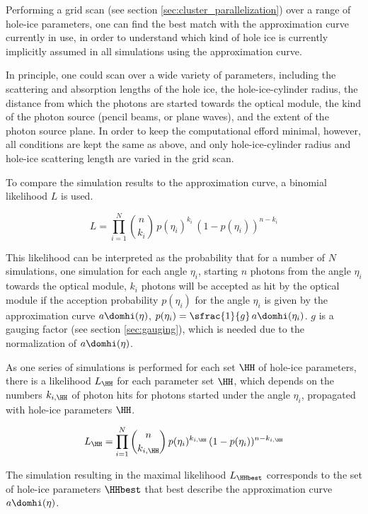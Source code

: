 Performing a grid scan (see section \ref{sec:cluster_parallelization}) over a range of hole-ice parameters, one can find the best match with the approximation curve currently in use, in order to understand which kind of hole ice is currently implicitly assumed in all simulations using the approximation curve.


In principle, one could scan over a wide variety of parameters, including the scattering and absorption lengths of the hole ice, the hole-ice-cylinder radius, the distance from which the photons are started towards the optical module, the kind of the photon source (pencil beams, or plane waves), and the extent of the photon source plane. In order to keep the computational efford minimal, however, all conditions are kept the same as above, and only hole-ice-cylinder radius and hole-ice scattering length are varied in the grid scan.

To compare the simulation results to the approximation curve, a binomial likelihood $L$ is used.

\begin{equation}
  L = \prod_{i=1}^N \binom{n}{k_i}\,p(\eta_i)^{k_i}\,(1-p(\eta_i))^{n-k_i}
\end{equation}

This likelihood can be interpreted as the probability that for a number of $N$ simulations, one simulation for each angle $\eta_i$, starting $n$ photons from the angle $\eta_i$ towards the optical module, $k_i$ photons will be accepted as hit by the optical module if the acception probability $p(\eta_i)$ for the angle $\eta_i$ is given by the approximation curve $a\domhi(\eta)$, $p(\eta_i) = \sfrac{1}{g}\,a\domhi(\eta_i)$. $g$ is a gauging factor (see section \ref{sec:gauging}), which is needed due to the normalization of $a\domhi(\eta)$.

As one series of simulations is performed for each set $\HH$ of hole-ice parameters, there is a likelihood $L_\HH$ for each parameter set $\HH$, which depends on the numbers $k_{i,\HH}$ of photon hits for photons started under the angle $\eta_i$, propagated with hole-ice parameters $\HH$.

$$
  L_\HH = \prod_{i=1}^N \binom{n}{k_{i,\HH}}\,p(\eta_i)^{k_{i,\HH}}\,(1-p(\eta_i))^{n-k_{i,\HH}}
$$


The simulation resulting in the maximal likelihood $L_\HHbest$ corresponds to the set of hole-ice parameters $\HHbest$ that best describe the approximation curve $a\domhi(\eta)$.

